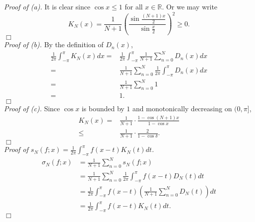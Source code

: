 \documentclass{article}
\begin{document}
\emph{Proof of (a).}
It is clear since $\cos x \leq 1$ for all $x \in \mathbb{R}$.
Or we may write
\[
  K_N(x) = \frac{1}{N+1} \left( \frac{\sin \frac{(N+1)x}{2}}{\sin \frac{x}{2}} \right)^2 \geq 0.
\]
$\Box$ \\

\emph{Proof of (b).}
By the definition of $D_n(x)$,
  \begin{align*}
     \frac{1}{2\pi} \int_{-\pi}^{\pi} K_N(x) dx
     =& \frac{1}{2\pi} \int_{-\pi}^{\pi} \frac{1}{N+1} \sum_{n=0}^{N} D_n(x) dx \\
     =& \frac{1}{N+1} \sum_{n=0}^{N} \frac{1}{2\pi} \int_{-\pi}^{\pi} D_n(x) dx \\
     =& \frac{1}{N+1} \sum_{n=0}^{N} 1 \\
     =& 1.
  \end{align*}
$\Box$ \\

\emph{Proof of (c).}
Since $\cos x$ is bounded by $1$ and monotonically decreasing on $(0, \pi]$,
  \begin{align*}
    K_N(x)
    =& \frac{1}{N+1} \cdot \frac{1-\cos(N+1)x}{1-\cos x} \\
    \leq& \frac{1}{N+1} \cdot \frac{2}{1-\cos \delta}.
  \end{align*}
$\Box$ \\

\emph{Proof of $s_N(f;x) = \frac{1}{2\pi} \int_{-\pi}^{\pi} f(x-t)K_N(t)dt$.}
  \begin{align*}
    \sigma_N(f;x)
    &= \frac{1}{N+1} \sum_{n=0}^{N} s_N(f;x) \\
    &= \frac{1}{N+1} \sum_{n=0}^{N} \frac{1}{2\pi} \int_{-\pi}^{\pi} f(x-t)D_N(t)dt \\
    &= \frac{1}{2\pi} \int_{-\pi}^{\pi} f(x-t)
      \left( \frac{1}{N+1} \sum_{n=0}^{N} D_N(t) \right) dt \\
    &= \frac{1}{2\pi} \int_{-\pi}^{\pi} f(x-t) K_N(t) dt.
  \end{align*}
$\Box$ \\
\end{document}
